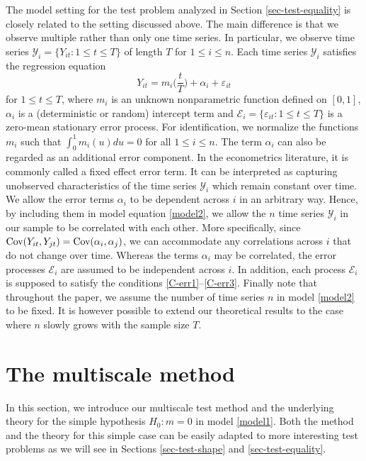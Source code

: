 The model setting for the test problem analyzed in Section \ref{sec-test-equality} is closely related to the setting discussed above. The main difference is that we observe multiple rather than only one time series. In particular, we observe time series $\mathcal{Y}_i = \{Y_{it}: 1 \le t \le T \}$ of length $T$ for $1 \le i \le n$. Each time series $\mathcal{Y}_i$ satisfies the regression equation \begin{equation}\label{model2}
Y_{it} = m_i \Big( \frac{t}{T} \Big) + \alpha_i + \varepsilon_{it} 
\end{equation}
for $1 \le t \le T$, where $m_i$ is an unknown nonparametric function defined on $[0,1]$, $\alpha_i$ is a (deterministic or random) intercept term and $\mathcal{E}_i = \{ \varepsilon_{it}: 1 \le t \le T \}$ is a zero-mean stationary error process. For identification, we normalize the functions $m_i$ such that $\int_0^1 m_i(u) du = 0$ for all $1 \le i \le n$. The term $\alpha_i$ can also be regarded as an additional error component. In the econometrics literature, it is commonly called a fixed effect error term. It can be interpreted as capturing unobserved characteristics of the time series $\mathcal{Y}_i$ which remain constant over time. We allow the error terms $\alpha_i$ to be dependent across $i$ in an arbitrary way. Hence, by including them in model equation \eqref{model2}, we allow the $n$ time series $\mathcal{Y}_i$ in our sample to be correlated with each other. More specifically, since $\textnormal{Cov}(Y_{it},Y_{jt}) = \textnormal{Cov}(\alpha_i,\alpha_j)$, we can accommodate any correlations across $i$ that do not change over time. Whereas the terms $\alpha_i$ may be correlated, the error processes $\mathcal{E}_i$ are assumed to be independent across $i$. In addition, each process $\mathcal{E}_i$ is supposed to satisfy the conditions \ref{C-err1}--\ref{C-err3}. Finally note that throughout the paper, we assume the number of time series $n$ in model \eqref{model2} to be fixed. It is however possible to extend our theoretical results to the case where $n$ slowly grows with the sample size $T$. 



\section{The multiscale method}\label{sec-method}


In this section, we introduce our multiscale test method and the underlying theory for the simple hypothesis $H_0: m = 0$ in model \eqref{model1}. Both the method and the theory for this simple case can be easily adapted to more interesting test problems as we will see in Sections \ref{sec-test-shape} and \ref{sec-test-equality}. 



